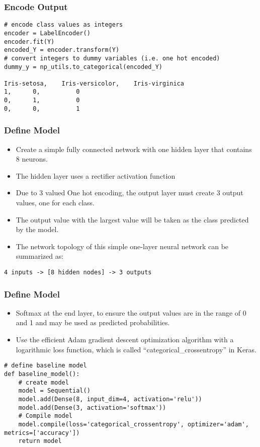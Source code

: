 \begin{frame}[fragile] \frametitle{ Encode Output}
\begin{lstlisting}
# encode class values as integers
encoder = LabelEncoder()
encoder.fit(Y)
encoded_Y = encoder.transform(Y)
# convert integers to dummy variables (i.e. one hot encoded)
dummy_y = np_utils.to_categorical(encoded_Y)

Iris-setosa,	Iris-versicolor,	Iris-virginica
1,		0,			0
0,		1, 			0
0, 		0, 			1
\end{lstlisting}
\end{frame}

\begin{frame}[fragile] \frametitle{ Define Model}
 \begin{itemize}
 \item  Create a simple fully connected network with one hidden layer that contains 8 neurons.
 \item The hidden layer uses a rectifier activation function
 \item Due to 3 valued One hot encoding, the output layer must create 3 output values, one for each class. 
 \item The output value with the largest value will be taken as the class predicted by the model.
 \item The network topology of this simple one-layer neural network can be summarized as:
 \end{itemize}
 \begin{lstlisting}
4 inputs -> [8 hidden nodes] -> 3 outputs
\end{lstlisting}
\end{frame}

\begin{frame}[fragile] \frametitle{ Define Model}
 \begin{itemize}
 \item  Softmax at the end layer,  to ensure the output values are in the range of 0 and 1 and may be used as predicted probabilities.
 \item Use the efficient Adam gradient descent optimization algorithm with a logarithmic loss function, which is called ``categorical\_crossentropy'' in Keras.
 \end{itemize}
 \begin{lstlisting}
# define baseline model
def baseline_model():
	# create model
	model = Sequential()
	model.add(Dense(8, input_dim=4, activation='relu'))
	model.add(Dense(3, activation='softmax'))
	# Compile model
	model.compile(loss='categorical_crossentropy', optimizer='adam', metrics=['accuracy'])
	return model
\end{lstlisting}
\end{frame}


